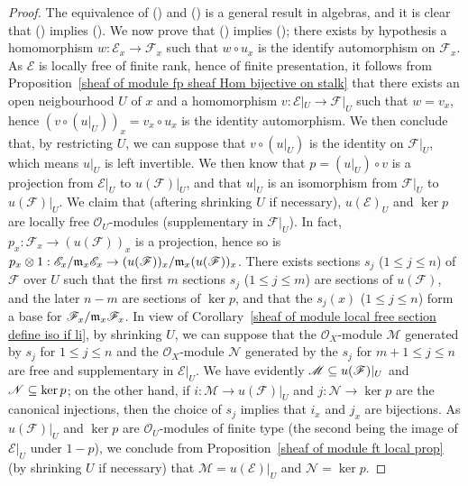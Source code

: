 \begin{proof}
The equivalence of () and () is a general result in algebras, and it is clear that () implies (). We now prove that () implies (); there exists by hypothesis a homomorphism $w:\mathscr{E}_x\to\mathscr{F}_x$ such that $w\circ u_x$ is the identify automorphism on $\mathscr{F}_x$. As $\mathscr{E}$ is locally free of finite rank, hence of finite presentation, it follows from Proposition~\ref{sheaf of module fp sheaf Hom bijective on stalk} that there exists an open neigbourhood $U$ of $x$ and a homomorphism $v:\mathscr{E}|_U\to\mathscr{F}|_U$ such that $w=v_x$, hence $(v\circ(u|_U))_x=v_x\circ u_x$ is the identity automorphism. We then conclude that, by restricting $U$, we can suppose that $v\circ(u|_U)$ is the identity on $\mathscr{F}|_U$, which means $u|_U$ is left invertible. We then know that $p=(u|_U)\circ v$ is a projection from $\mathscr{E}|_U$ to $u(\mathscr{F})|_U$, and that $u|_U$ is an isomorphism from $\mathscr{F}|_U$ to $u(\mathscr{F})|_U$. We claim that (aftering shrinking $U$ if necessary), $u(\mathscr{E})_U$ and $\ker p$ are locally free $\mathscr{O}_U$-modules (supplementary in $\mathscr{F}|_U$). In fact, $p_x:\mathscr{F}_x\to(u(\mathscr{F}))_x$ is a projection, hence so is $p_x\otimes 1:\mathscr{E}_x/\mathfrak{m}_x\mathscr{E}_x\to(u(\mathscr{F}))_x/\mathfrak{m}_x(u(\mathscr{F}))_x$. There exists sections $s_j$ ($1\leq j\leq n$) of $\mathscr{F}$ over $U$ such that the first $m$ sections $s_j$ ($1\leq j\leq m$) are sections of $u(\mathscr{F})$, and the later $n-m$ are sections of $\ker p$, and that the $s_j(x)$ ($1\leq j\leq n$) form a base for $\mathscr{F}_x/\mathfrak{m}_x\mathscr{F}_x$. In view of Corollary~\ref{sheaf of module local free section define iso if li}, by shrinking $U$, we can suppose that the $\mathscr{O}_X$-module $\mathscr{M}$ generated by $s_j$ for $1\leq j\leq n$ and the $\mathscr{O}_X$-module $\mathscr{N}$ generated by the $s_j$ for $m+1\leq j\leq n$ are free and supplementary in $\mathscr{E}|_U$. We have evidently $\mathscr{M}\subseteq u(\mathscr{F})|_U$ and $\mathscr{N}\subseteq\operatorname{ker} p$; on the other hand, if $i:\mathscr{M}\to u(\mathscr{F})|_U$ and $j:\mathscr{N}\to\ker p$ are the canonical injections, then the choice of $s_j$ implies that $i_x$ and $j_x$ are bijections. As $u(\mathscr{F})|_U$ and $\ker p$ are $\mathscr{O}_U$-modules of finite type (the second being the image of $\mathscr{E}|_U$ under $1-p$), we conclude from Proposition~\ref{sheaf of module ft local prop} (by shrinking $U$ if necessary) that $\mathscr{M}=u(\mathscr{E})|_U$ and $\mathscr{N}=\ker p$.
\end{proof}

